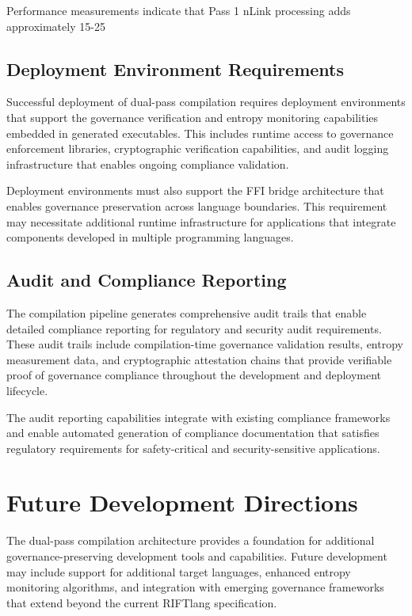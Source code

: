 Performance measurements indicate that Pass 1 nLink processing adds approximately 15-25%

\subsection{Deployment Environment Requirements}

Successful deployment of dual-pass compilation requires deployment environments that support the governance verification and entropy monitoring capabilities embedded in generated executables. This includes runtime access to governance enforcement libraries, cryptographic verification capabilities, and audit logging infrastructure that enables ongoing compliance validation.

Deployment environments must also support the FFI bridge architecture that enables governance preservation across language boundaries. This requirement may necessitate additional runtime infrastructure for applications that integrate components developed in multiple programming languages.

\subsection{Audit and Compliance Reporting}

The compilation pipeline generates comprehensive audit trails that enable detailed compliance reporting for regulatory and security audit requirements. These audit trails include compilation-time governance validation results, entropy measurement data, and cryptographic attestation chains that provide verifiable proof of governance compliance throughout the development and deployment lifecycle.

The audit reporting capabilities integrate with existing compliance frameworks and enable automated generation of compliance documentation that satisfies regulatory requirements for safety-critical and security-sensitive applications.

\section*{Future Development Directions}

The dual-pass compilation architecture provides a foundation for additional governance-preserving development tools and capabilities. Future development may include support for additional target languages, enhanced entropy monitoring algorithms, and integration with emerging governance frameworks that extend beyond the current RIFTlang specification.

